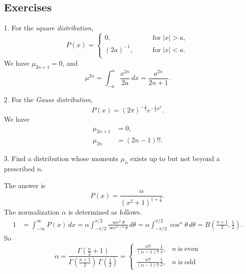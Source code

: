 \documentclass{book}
\numberwithin{equation}{section}
\theoremstyle{plain}
\theoremstyle{definition}
\theoremstyle{remark}
\begin{document}
\subsection*{Exercises}

1. For the \emph{square distribution},
\begin{equation}
P(x) =
\begin{cases}
  0,          \qquad &\mathrm{for\;} |x| > a, \\
  (2a)^{-1},  \qquad &\mathrm{for\;} |x| < a. \\
\end{cases}
\end{equation}
We have $\mu_{2n+1} = 0$, and
$$
\mu^{2n}
=
\int_{-a}^a \frac{x^{2n}}{2a} \, dx
=
\frac{ a^{2n} }{ 2n + 1 }.
$$


2. For the \emph{Gauss distribution},
\begin{equation}
  P(x) = (2 \pi)^{-\frac 1 2} e^{-\frac{1}{2} x^2}.
\end{equation}
We have
$$
\begin{aligned}
  \mu_{2n+1} &= 0, \\
  \mu_{2n}  &= (2n-1)!!.
\end{aligned}
$$

3. Find a distribution whose moments $\mu_n$ exists up to but not beyond a prescribed $n$.

The answer is
$$
P(x) = \frac{ \alpha } { (x^2 + 1)^{1 + \frac{n}{2} } }.
$$
The normalization $\alpha$ is determined as follows.
$$
\begin{aligned}
1 &= \int_{-\infty}^\infty P(x) \, dx
  = \alpha \int_{-\pi/2}^{\pi/2} \frac{ \sec^2\theta } { \sec^{n+2}\theta } \, d\theta
  =\alpha \int_{-\pi/2}^{\pi/2} \cos^n\theta \, d\theta
  = B\left(\frac{n+1}{2}, \frac{1}{2}\right).
\end{aligned}
$$
So
$$
\alpha = \frac{ \Gamma(\frac n  2 + 1) } { \Gamma(\frac{n+1}{2}) \, \Gamma(\frac 1 2) }
=
\begin{cases}
  \frac{n!!}{(n-1)!! }\frac{1}{\pi}, & n \mathrm{\; is \; even} \\
  \frac{n!!}{(n-1)!! }\frac{1}{2}, & n \mathrm{\; is \; odd}
\end{cases}
$$
\end{document}
